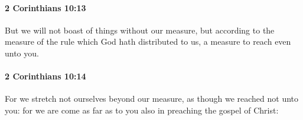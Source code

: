 		\paragraph{2 Corinthians 10:13} %
			\label{2CORINTHIANS-10-13}

			But we will not boast of things without our measure, but according to the measure of the rule which God hath distributed to us, a measure to reach even unto you.

			\begin{framed}
			\scriptsize
				\begin{compactdesc}
					\item[SBLG] 
				\end{compactdesc}
			\end{framed}

		\paragraph{2 Corinthians 10:14} %
			\label{2CORINTHIANS-10-14}

			For we stretch not ourselves beyond our measure, as though we reached not unto you: for we are come as far as to you also in preaching the gospel of Christ:

